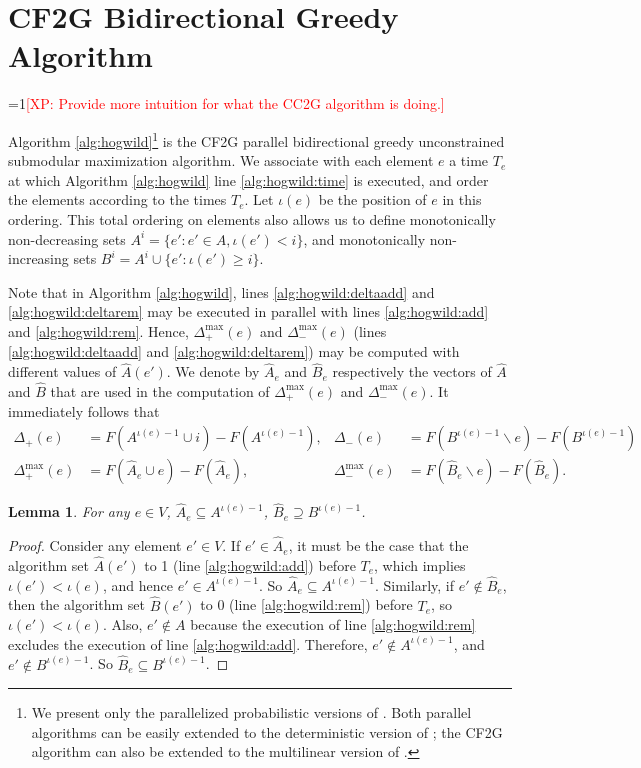 \documentclass{article} %
\newcommand{\hogwild}{CF2G}
\newcommand{\occ}{CC2G}
\newtheorem{lem}[thm]{Lemma}
\newcommand{\Comments}{1}
\newcommand{\note}[2]{\ifnum\Comments=1\textcolor{#1}{#2}\fi}
\newcommand{\xinghao}[1]{\note{red}{[XP: #1]}}
\begin{document}
\section{\hogwild{} Bidirectional Greedy Algorithm}
\xinghao{Provide more intuition for what the \occ{} algorithm is doing.}

Algorithm \ref{alg:hogwild}\footnote{We present only the parallelized probabilistic versions of \cite{buchbinder2012}. Both parallel algorithms can be easily extended to the deterministic version of \cite{buchbinder2012}; the \hogwild{} algorithm can also be extended to the multilinear version of \cite{buchbinder2012}.} is the \hogwild{} parallel bidirectional greedy unconstrained submodular maximization algorithm.
We associate with each element $e$ a time $T_e$ at which Algorithm \ref{alg:hogwild} line \ref{alg:hogwild:time} is executed, and order the elements according to the times $T_e$.
Let $\iota(e)$ be the position of $e$ in this ordering.
This total ordering on elements also allows us to define monotonically non-decreasing sets $A^i = \{e' : e' \in A, \iota(e') < i\}$, and monotonically non-increasing sets $B^i = A^i \cup \{e': \iota(e') \geq i\}$.

Note that in Algorithm \ref{alg:hogwild}, lines \ref{alg:hogwild:deltaadd} and \ref{alg:hogwild:deltarem} may be executed in parallel with lines \ref{alg:hogwild:add} and \ref{alg:hogwild:rem}.
Hence, $\Delta_+^{\max}(e)$ and $\Delta_-^{\max}(e)$ (lines \ref{alg:hogwild:deltaadd} and \ref{alg:hogwild:deltarem}) may be computed with different values of $\hat{A}(e')$.
We denote by $\hat{A}_e$ and $\hat{B}_e$ respectively the vectors of $\hat{A}$ and $\hat{B}$ that are used in the computation of $\Delta_+^{\max}(e)$ and $\Delta_-^{\max}(e)$.
It immediately follows that
\begin{align*}
  \Delta_{+}       (e) &= F(A^{\iota(e)-1}\cup i) - F(A^{\iota(e)-1}),
& \Delta_{-}       (e) &= F(B^{\iota(e)-1}\backslash e) - F(B^{\iota(e)-1})\\
  \Delta_{+}^{\max}(e) &= F(\hat{A}_e\cup e) - F(\hat{A}_e),
& \Delta_{-}^{\max}(e) &= F(\hat{B}_e\backslash e) - F(\hat{B}_e).
\end{align*}



\begin{lem}\label{lem:hog:set_bound} For any $e\in V$, $\hat{A}_e \subseteq A^{\iota(e)-1}$, $\hat{B}_e \supseteq B^{\iota(e)-1}$.
\end{lem}
\begin{proof}
Consider any element $e'\in V$.
If $e'\in \hat{A}_e$, it must be the case that the algorithm set $\hat{A}(e')$ to 1 (line \ref{alg:hogwild:add}) before $T_e$, which implies $\iota(e') < \iota(e)$, and hence $e' \in A^{\iota(e)-1}$.
So $\hat{A}_e \subseteq A^{\iota(e)-1}$.
Similarly, if $e'\not\in \hat{B}_e$, then the algorithm set $\hat{B}(e')$ to 0 (line \ref{alg:hogwild:rem}) before $T_e$, so $\iota(e') < \iota(e)$.
Also, $e'\not\in A$ because the execution of line \ref{alg:hogwild:rem} excludes the execution of line \ref{alg:hogwild:add}.
Therefore, $e'\not\in A^{\iota(e)-1}$, and $e'\not\in B^{\iota(e)-1}$.
So $\hat{B}_e \subseteq B^{\iota(e)-1}$.
\end{proof}
\end{document}
